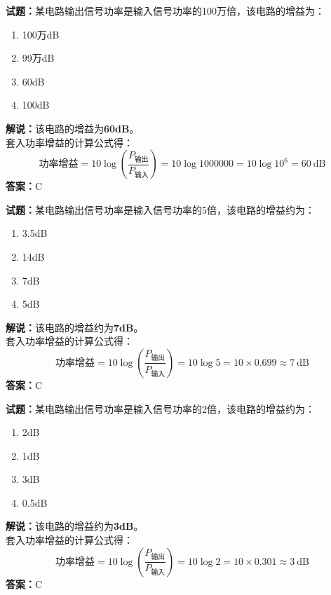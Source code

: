 \documentclass{ctexbook}
\begin{document}
\bigskip




\noindent\textbf{试题：}某电路输出信号功率是输入信号功率的100万倍，该电路的增益为：
\begin{enumerate}[leftmargin=3em]
\item 100万dB
\item 99万dB
\item 60dB
\item 100dB
\end{enumerate}
\noindent\textbf{解说：}该电路的增益为\textbf{60dB}。\\
套入功率增益的计算公式得：
$$\mbox{功率增益}=10 \log \left( {\frac{P_{ \mbox{输出} }}{P_{ \mbox{输入} }}} \right)=10 \log 1000000 = 10 \log 10^6 = 60 \ \mathrm{dB}$$
\noindent\textbf{答案：}C

\bigskip




\noindent\textbf{试题：}某电路输出信号功率是输入信号功率的5倍，该电路的增益约为：
\begin{enumerate}[leftmargin=3em]
\item 3.5dB
\item 14dB
\item 7dB
\item 5dB
\end{enumerate}
\noindent\textbf{解说：}该电路的增益约为\textbf{7dB}。\\
套入功率增益的计算公式得：
$$\mbox{功率增益}=10 \log \left( {\frac{P_{ \mbox{输出} }}{P_{ \mbox{输入} }}} \right)=10 \log 5 = 10 \times 0.699 \approx 7 \ \mathrm{dB}$$
\noindent\textbf{答案：}C

\bigskip




\noindent\textbf{试题：}某电路输出信号功率是输入信号功率的2倍，该电路的增益约为：
\begin{enumerate}[leftmargin=3em]
\item 2dB
\item 1dB
\item 3dB
\item 0.5dB
\end{enumerate}
\noindent\textbf{解说：}该电路的增益约为\textbf{3dB}。\\
套入功率增益的计算公式得：
$$\mbox{功率增益}=10 \log \left( {\frac{P_{ \mbox{输出} }}{P_{ \mbox{输入} }}} \right)=10 \log 2 = 10 \times 0.301 \approx 3 \ \mathrm{dB}$$
\noindent\textbf{答案：}C

\bigskip
\end{document}
